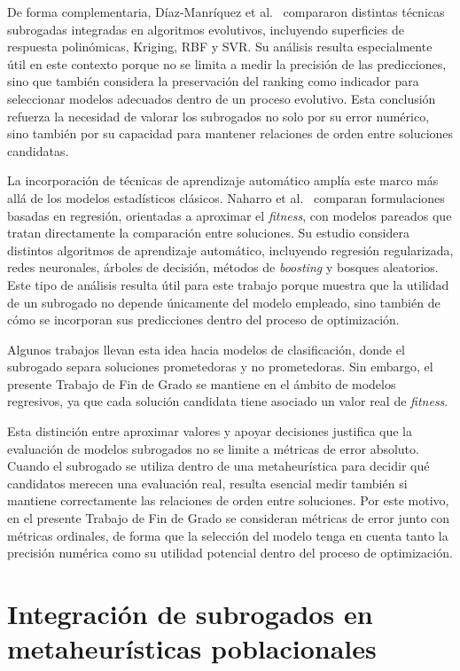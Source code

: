 De forma complementaria, Díaz-Manríquez et
al.~\cite{diaz2017metamodeling} compararon distintas técnicas subrogadas
integradas en algoritmos evolutivos, incluyendo superficies de respuesta
polinómicas, Kriging, RBF y SVR. Su análisis resulta especialmente útil en este
contexto porque no se limita a medir la precisión de las predicciones, sino que
también considera la preservación del ranking como indicador para seleccionar
modelos adecuados dentro de un proceso evolutivo. Esta conclusión refuerza la
necesidad de valorar los subrogados no solo por su error numérico, sino también
por su capacidad para mantener relaciones de orden entre soluciones candidatas.

La incorporación de técnicas de aprendizaje automático amplía este marco más
allá de los modelos estadísticos clásicos. Naharro et
al.~\cite{naharro2022regressionPairwise} comparan formulaciones basadas en
regresión, orientadas a aproximar el \textit{fitness}, con modelos pareados
que tratan directamente la comparación entre soluciones. Su estudio considera
distintos algoritmos de aprendizaje automático, incluyendo regresión
regularizada, redes neuronales, árboles de decisión, métodos de \textit{boosting}
y bosques aleatorios. Este tipo de análisis resulta útil para este trabajo
porque muestra que la utilidad de un subrogado no depende únicamente del modelo
empleado, sino también de cómo se incorporan sus predicciones dentro del
proceso de optimización.

Algunos trabajos llevan esta idea hacia modelos de clasificación, donde el
subrogado separa soluciones prometedoras y no prometedoras. Sin embargo, el presente
Trabajo de Fin de Grado se mantiene en el ámbito de modelos regresivos, ya que
cada solución candidata tiene asociado un valor real de \textit{fitness}.

Esta distinción entre aproximar valores y apoyar decisiones justifica que la
evaluación de modelos subrogados no se limite a métricas de error absoluto.
Cuando el subrogado se utiliza dentro de una metaheurística para decidir qué
candidatos merecen una evaluación real, resulta esencial medir también si
mantiene correctamente las relaciones de orden entre soluciones. Por este
motivo, en el presente Trabajo de Fin de Grado se consideran métricas de error
junto con métricas ordinales, de forma que la selección del modelo tenga en
cuenta tanto la precisión numérica como su utilidad potencial dentro del
proceso de optimización.

\section{Integración de subrogados en metaheurísticas poblacionales}
\label{sec:estado_integracion_metaheuristicas}

